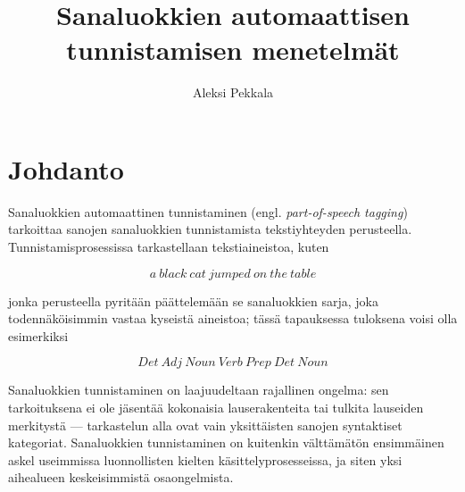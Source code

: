 \documentclass[utf8,bachelor,manualbib]{gradu3}
\begin{document}
\title{Sanaluokkien automaattisen tunnistamisen menetelmät}



\author{Aleksi Pekkala}

\maketitle
  
\mainmatter


\chapter{Johdanto}


Sanaluokkien automaattinen tunnistaminen (engl. \emph{part-of-speech tagging}) tarkoittaa sanojen sanaluokkien tunnistamista tekstiyhteyden perusteella.  Tunnistamisprosessissa tarkastellaan tekstiaineistoa, kuten

\[a\:black\:cat\:jumped\:on\:the\:table\]

jonka perusteella pyritään päättelemään se sanaluokkien sarja, joka todennäköisimmin vastaa kyseistä aineistoa; tässä tapauksessa tuloksena voisi olla esimerkiksi

\[Det\:Adj\:Noun\:Verb\:Prep\:Det\:Noun\]

Sanaluokkien tunnistaminen on laajuudeltaan rajallinen ongelma: sen tarkoituksena ei ole jäsentää kokonaisia lauserakenteita tai tulkita lauseiden merkitystä --- tarkastelun alla ovat vain yksittäisten sanojen syntaktiset kategoriat. Sanaluokkien tunnistaminen on kuitenkin välttämätön ensimmäinen askel useimmissa luonnollisten kielten käsittelyprosesseissa, ja siten yksi aihealueen keskeisimmistä osaongelmista.
\end{document}
